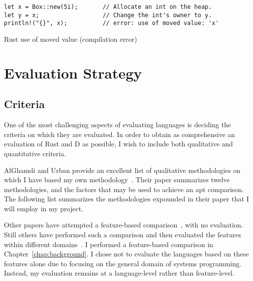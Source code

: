 \documentclass[finalcopy]{srpaper}
\begin{document}
\begin{listing}[h]
\begin{verbatim}
let x = Box::new(5i);       // Allocate an int on the heap.
let y = x;                  // Change the int's owner to y.
println!("{}", x);          // error: use of moved value: 'x'
\end{verbatim}
\caption{Rust use of moved value (compilation error)}
\label{lst:rustuseaftermove}
\end{listing}

\chapter{Evaluation Strategy}

\section{Criteria}

One of the most challenging aspects of evaluating languages is deciding the
criteria on which they are evaluated. In order to obtain as comprehensive an
evaluation of Rust and D as possible, I wish to include both qualitative and
quantitative criteria.

AlGhamdi and Urban provide an excellent list of qualitative methodologies on
which I have based my own methodology~\cite{AlGhamdi:1993:CAP:162754.162876}.
Their paper summarizes twelve methodologies, and the factors that may be used
to achieve an apt comparison. The following list summarizes the methodologies
expounded in their paper that I will employ in my project.

Other papers have attempted a feature-based
comparison~\cite{comparingFunctional}, with no evaluation. Still others have
performed such a comparison and then evaluated the features within different
domains~\cite{Feuer:1982:CPL:356869.356872}. I performed a feature-based
comparison in Chapter~\ref{chap:background}. I chose not to evaluate the
languages based on these features alone due to focusing on the general domain
of systems programming. Instead, my evaluation remains at a language-level
rather than feature-level.
\end{document}
